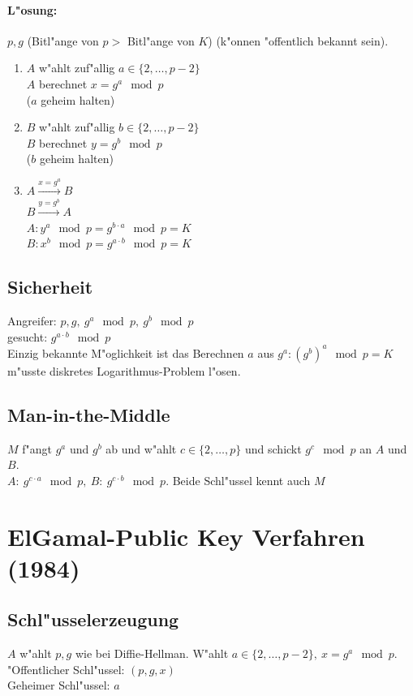 \paragraph{L"osung:} $p, g$ (Bitl"ange von $p>$ Bitl"ange von $K$) (k"onnen "offentlich bekannt sein).\\
\begin{enumerate}
	\item $A$ w"ahlt zuf"allig $a\in \{2,\ldots,p-2\}$\\
	$A$ berechnet $x=g^a \mod{p}$\\
	($a$ geheim halten)
	\item $B$ w"ahlt zuf"allig $b\in \{2,\ldots,p-2\}$\\
	$B$ berechnet $y=g^b \mod{p}$\\
	($b$ geheim halten)
	\item $A \xrightarrow{x=g^a} B$\\
	$B \xrightarrow{y=g^b} A$\\
	$A: y^a \mod{p} = g^{b\cdot a} \mod{p} = K$\\
	$B: x^b \mod{p} = g^{a\cdot b} \mod{p} = K$
\end{enumerate}
\subsection{Sicherheit}
Angreifer: $p,g,\ g^a \mod{p},\ g^b \mod{p}$\\
gesucht: $g^{a\cdot b} \mod{p}$\\
Einzig bekannte M"oglichkeit ist das Berechnen $a$ aus $g^a:(g^b)^a \mod{p}=K$ m"usste diskretes Logarithmus-Problem l"osen.

\subsection{Man-in-the-Middle}
$M$ f"angt $g^a$ und $g^b$ ab und w"ahlt $c \in \{2,\ldots,p\}$ und schickt $g^c \mod{p}$ an $A$ und $B$.\\
$A:\ g^{c\cdot a} \mod{p},\ B:\ g^{c\cdot b} \mod{p}$. Beide Schl"ussel kennt auch $M$

\section{ElGamal-Public Key Verfahren (1984)}

\subsection{Schl"usselerzeugung}
$A$ w"ahlt $p,g$ wie bei Diffie-Hellman. W"ahlt $a \in \{2,\ldots,p-2\},\ x=g^a \mod{p}$.\\
"Offentlicher Schl"ussel: $(p,g,x)$\\
Geheimer Schl"ussel: $a$

